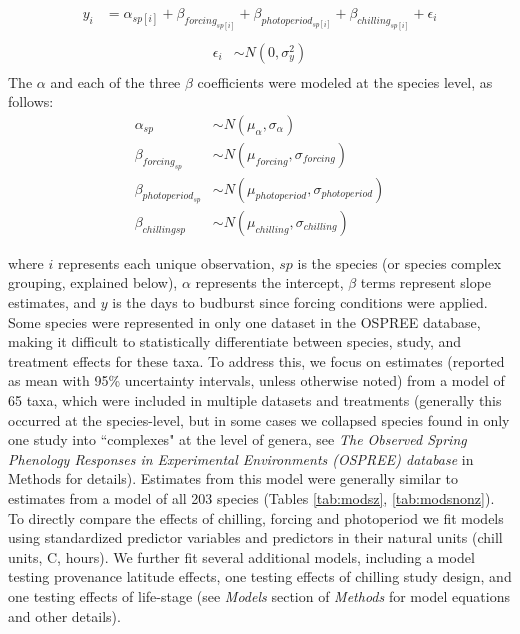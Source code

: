 \documentclass{article}
\begin{document}
\begin{align*}
y_i &= \alpha_{sp[i]} + \beta_{forcing_{sp[i]}} + \beta_{photoperiod_{sp[i]}} + \beta_{chilling_{sp[i]}} + \epsilon_i\\
\end{align*}
\begin{align*}
\epsilon_i & \sim N(0,\sigma^2_y) \\
\end{align*}
\noindent The $\alpha$ and each of the three $\beta$ coefficients were modeled at the species level, as follows:
\begin{align*}
\alpha_{sp} & \sim N(\mu_{\alpha}, \sigma_{\alpha}) \\
\beta_{forcing_{sp}} & \sim N(\mu_{forcing}, \sigma_{forcing}) \\
\beta_{photoperiod_{sp}} & \sim N(\mu_{photoperiod}, \sigma_{photoperiod})\\
\beta_{chilling{sp}} & \sim N(\mu_{chilling}, \sigma_{chilling})
\end{align*}

where $i$ represents each unique observation, $sp$ is the species (or species complex grouping, explained below), $\alpha$ represents the intercept, $\beta$ terms represent slope estimates, and $y$ is the days to budburst since forcing conditions were applied. Some species were represented in only one dataset in the OSPREE database, making it difficult to statistically differentiate between species, study, and treatment effects for these taxa. To address this, we focus on estimates (reported as mean with 95\% uncertainty intervals, unless otherwise noted) from a model of 65 taxa, which were included in multiple datasets and treatments (generally this occurred at the species-level, but in some cases we collapsed species found in only one study into ``complexes" at the level of genera, see \emph{The Observed Spring Phenology Responses in Experimental Environments (OSPREE) database} in Methods for details). Estimates from this model were generally similar to estimates from a model of all 203 species (Tables \ref{tab:modsz}, \ref{tab:modsnonz}). To directly compare the effects of chilling, forcing and photoperiod we fit models using standardized predictor variables \emph{\citep[{\normalfont following}][{\normalfont which we refer to as ``standard units''}]{gelman2006}} and predictors in their natural units (chill units, \degree C, hours). We further fit several additional models, including a model testing provenance latitude effects, one testing effects of chilling study design, and one testing effects of life-stage (see \emph{Models} section of \emph{Methods} for model equations and other details). 
\end{document}
